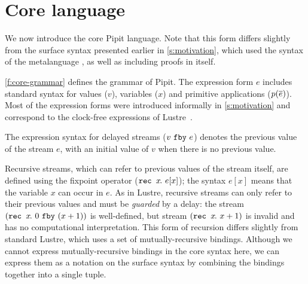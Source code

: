 
\section{Core language}
\label{s:core}



We now introduce the core Pipit language.
Note that this form differs slightly from the surface syntax presented earlier in \autoref{s:motivation}, which used the syntax of the metalanguage \fstar{}, as well as including proofs in \fstar{} itself.

\autoref{f:core-grammar} defines the grammar of Pipit.
The expression form $e$ includes standard syntax for values ($v$), variables ($x$) and primitive applications ($p(\overline{e})$).
Most of the expression forms were introduced informally in \autoref{s:motivation} and correspond to the clock-free expressions of Lustre~\cite{caspi1995functional}.

The expression syntax for delayed streams ($v~\texttt{fby}~e$) denotes the previous value of the stream $e$, with an initial value of $v$ when there is no previous value.

Recursive streams, which can refer to previous values of the stream itself, are defined using the fixpoint operator ($\texttt{rec~} x\hspace{-0.1em}.~e[x]$); the syntax $e[x]$ means that the variable $x$ can occur in $e$.
As in Lustre, recursive streams can only refer to their previous values and must be \emph{guarded} by a delay: the stream $(\texttt{rec~} x\hspace{-0.1em}.~0~\texttt{fby}~(x + 1))$ is well-defined, but stream $(\texttt{rec~} x\hspace{-0.1em}.~x + 1)$ is invalid and has no computational interpretation.
This form of recursion differs slightly from standard Lustre, which uses a set of mutually-recursive bindings.
Although we cannot express mutually-recursive bindings in the core syntax here, we can express them as a notation on the surface syntax by combining the bindings together into a single tuple.

